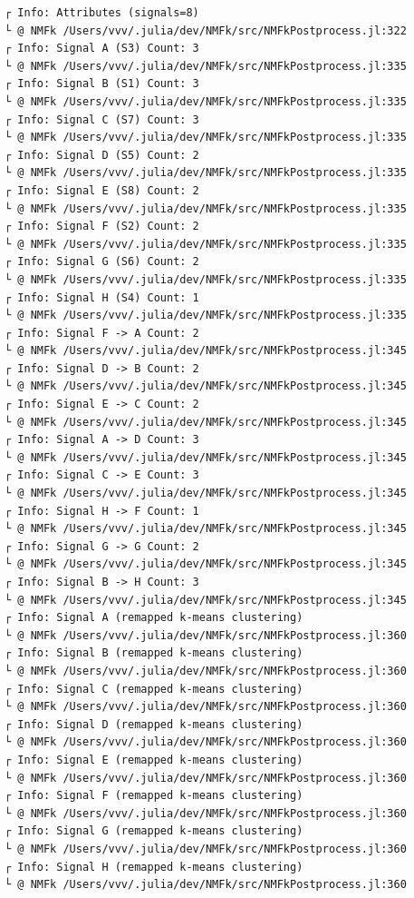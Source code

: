 \documentclass[11pt]{article}
\begin{document}
    \begin{Verbatim}[commandchars=\\\{\}]
┌ Info: Attributes (signals=8)
└ @ NMFk /Users/vvv/.julia/dev/NMFk/src/NMFkPostprocess.jl:322
┌ Info: Signal A (S3) Count: 3
└ @ NMFk /Users/vvv/.julia/dev/NMFk/src/NMFkPostprocess.jl:335
┌ Info: Signal B (S1) Count: 3
└ @ NMFk /Users/vvv/.julia/dev/NMFk/src/NMFkPostprocess.jl:335
┌ Info: Signal C (S7) Count: 3
└ @ NMFk /Users/vvv/.julia/dev/NMFk/src/NMFkPostprocess.jl:335
┌ Info: Signal D (S5) Count: 2
└ @ NMFk /Users/vvv/.julia/dev/NMFk/src/NMFkPostprocess.jl:335
┌ Info: Signal E (S8) Count: 2
└ @ NMFk /Users/vvv/.julia/dev/NMFk/src/NMFkPostprocess.jl:335
┌ Info: Signal F (S2) Count: 2
└ @ NMFk /Users/vvv/.julia/dev/NMFk/src/NMFkPostprocess.jl:335
┌ Info: Signal G (S6) Count: 2
└ @ NMFk /Users/vvv/.julia/dev/NMFk/src/NMFkPostprocess.jl:335
┌ Info: Signal H (S4) Count: 1
└ @ NMFk /Users/vvv/.julia/dev/NMFk/src/NMFkPostprocess.jl:335
┌ Info: Signal F -> A Count: 2
└ @ NMFk /Users/vvv/.julia/dev/NMFk/src/NMFkPostprocess.jl:345
┌ Info: Signal D -> B Count: 2
└ @ NMFk /Users/vvv/.julia/dev/NMFk/src/NMFkPostprocess.jl:345
┌ Info: Signal E -> C Count: 2
└ @ NMFk /Users/vvv/.julia/dev/NMFk/src/NMFkPostprocess.jl:345
┌ Info: Signal A -> D Count: 3
└ @ NMFk /Users/vvv/.julia/dev/NMFk/src/NMFkPostprocess.jl:345
┌ Info: Signal C -> E Count: 3
└ @ NMFk /Users/vvv/.julia/dev/NMFk/src/NMFkPostprocess.jl:345
┌ Info: Signal H -> F Count: 1
└ @ NMFk /Users/vvv/.julia/dev/NMFk/src/NMFkPostprocess.jl:345
┌ Info: Signal G -> G Count: 2
└ @ NMFk /Users/vvv/.julia/dev/NMFk/src/NMFkPostprocess.jl:345
┌ Info: Signal B -> H Count: 3
└ @ NMFk /Users/vvv/.julia/dev/NMFk/src/NMFkPostprocess.jl:345
┌ Info: Signal A (remapped k-means clustering)
└ @ NMFk /Users/vvv/.julia/dev/NMFk/src/NMFkPostprocess.jl:360
┌ Info: Signal B (remapped k-means clustering)
└ @ NMFk /Users/vvv/.julia/dev/NMFk/src/NMFkPostprocess.jl:360
┌ Info: Signal C (remapped k-means clustering)
└ @ NMFk /Users/vvv/.julia/dev/NMFk/src/NMFkPostprocess.jl:360
┌ Info: Signal D (remapped k-means clustering)
└ @ NMFk /Users/vvv/.julia/dev/NMFk/src/NMFkPostprocess.jl:360
┌ Info: Signal E (remapped k-means clustering)
└ @ NMFk /Users/vvv/.julia/dev/NMFk/src/NMFkPostprocess.jl:360
┌ Info: Signal F (remapped k-means clustering)
└ @ NMFk /Users/vvv/.julia/dev/NMFk/src/NMFkPostprocess.jl:360
┌ Info: Signal G (remapped k-means clustering)
└ @ NMFk /Users/vvv/.julia/dev/NMFk/src/NMFkPostprocess.jl:360
┌ Info: Signal H (remapped k-means clustering)
└ @ NMFk /Users/vvv/.julia/dev/NMFk/src/NMFkPostprocess.jl:360
    \end{Verbatim}
\end{document}
